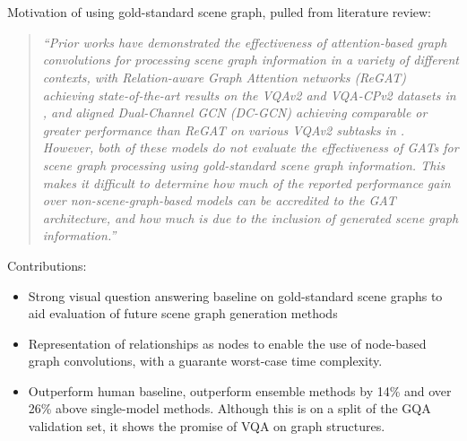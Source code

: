 \chapter*{}

{\color{red}
Motivation of using gold-standard scene graph, pulled from literature review:

\begin{quote}
    \textit{``Prior works have demonstrated the effectiveness of attention-based graph convolutions for processing scene graph information in a variety of different contexts, with Relation-aware Graph Attention networks (ReGAT) \cite{li2019relation} achieving state-of-the-art results on the VQAv2 and VQA-CPv2 datasets in \citeyear{li2019relation}, and aligned Dual-Channel GCN (DC-GCN) \cite{huang2020aligned} achieving comparable or greater performance than ReGAT on various VQAv2 subtasks in \citeyear{huang2020aligned}. However, both of these models do not evaluate the effectiveness of GATs for scene graph processing using gold-standard scene graph information. This makes it difficult to determine how much of the reported performance gain over non-scene-graph-based models can be accredited to the GAT architecture, and how much is due to the inclusion of generated scene graph information.''}
\end{quote}

Contributions:

\begin{itemize}
    \item Strong visual question answering baseline on gold-standard scene graphs to aid evaluation of future scene graph generation methods
    \item Representation of relationships as nodes to enable the use of node-based graph convolutions, with a guarante worst-case time complexity.
    \item Outperform human baseline, outperform ensemble methods by 14\% and over 26\% above single-model methods. Although this is on a split of the GQA validation set, it shows the promise of VQA on graph structures.
\end{itemize}
}